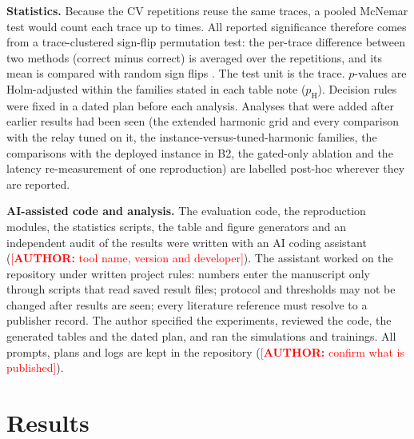 \documentclass[preprint,12pt]{elsarticle}
\newcommand{\placeholder}[1]{\textcolor{red}{[\textbf{AUTHOR:} #1]}}
\begin{document}
\textbf{Statistics.} Because the \nSeeds{} CV repetitions reuse the same traces, a pooled McNemar test would count each trace up to \nSeeds{} times. All reported significance therefore comes from a trace-clustered sign-flip permutation test: the per-trace difference between two methods (correct minus correct) is averaged over the repetitions, and its mean is compared with \permDraws{} random sign flips \citep{dietterich1998,demsar2006}. The test unit is the trace. $p$-values are Holm-adjusted \citep{holm1979} within the families stated in each table note ($p_{\mathrm{H}}$). Decision rules were fixed in a dated plan before each analysis. Analyses that were added after earlier results had been seen (the extended harmonic grid and every comparison with the relay tuned on it, the instance-versus-tuned-harmonic families, the comparisons with the deployed instance in B2, the gated-only ablation and the latency re-measurement of one reproduction) are labelled post-hoc wherever they are reported.

\textbf{AI-assisted code and analysis.} The evaluation code, the reproduction modules, the statistics scripts, the table and figure generators and an independent audit of the results were written with an AI coding assistant (\placeholder{tool name, version and developer}). The assistant worked on the repository under written project rules: numbers enter the manuscript only through scripts that read saved result files; protocol and thresholds may not be changed after results are seen; every literature reference must resolve to a publisher record. The author specified the experiments, reviewed the code, the generated tables and the dated plan, and ran the simulations and trainings. All prompts, plans and logs are kept in the repository (\placeholder{confirm what is published}).

\section{Results}
\label{sec:results}
\end{document}
